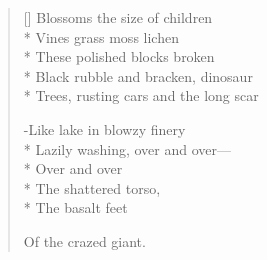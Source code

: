 \begin{verse}[\versewidth]
Blossoms the size of children\\*
Vines grass moss lichen\\*
These polished blocks broken\\*
Black rubble and bracken, dinosaur\\*
Trees, rusting cars and the long scar

-Like lake in blowzy finery\\*
Lazily washing, over and over---\\*
Over and over\\*
The shattered torso,\\*
The basalt feet

Of the crazed giant.
\end{verse}
